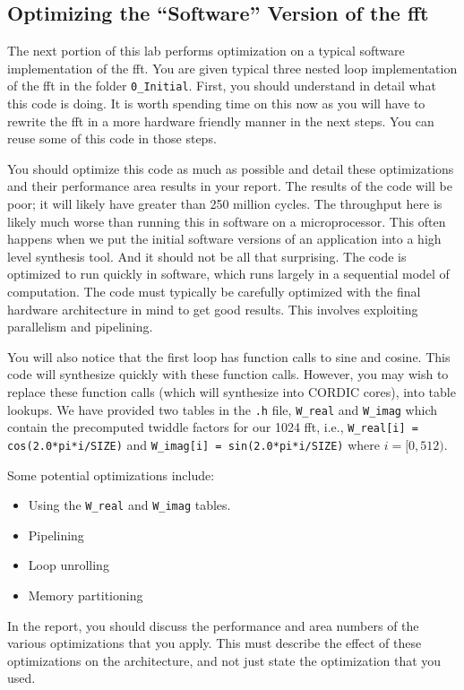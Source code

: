 \subsection{Optimizing the ``Software'' Version of the \gls{fft}}
The next portion of this lab performs optimization on a typical software implementation of the \gls{fft}. You are given typical three nested loop implementation of the \gls{fft} in the folder \texttt{0\_Initial}. First, you should understand in detail what this code is doing. It is worth spending time on this now as you will have to rewrite the \gls{fft} in a more hardware friendly manner in the next steps. You can reuse some of this code in those steps.

You should optimize this code as much as possible and detail these optimizations and their performance area results in your report. The results of the code will be poor; it will likely have greater than 250 million cycles. The throughput here is likely much worse than running this in software on a microprocessor. This often happens when we put the initial software versions of an application into a high level synthesis tool. And it should not be all that surprising. The code is optimized to run quickly in software, which runs largely in a sequential model of computation. The code must typically be carefully optimized with the final hardware architecture in mind to get good results. This involves exploiting parallelism and pipelining.

You will also notice that the first loop has function calls to sine and cosine. This code will synthesize quickly with these function calls. However, you may wish to replace these function calls (which will synthesize into CORDIC cores), into table lookups. We have provided two tables in the \texttt{.h} file, \texttt{W\_real} and \texttt{W\_imag} which contain the precomputed twiddle factors for our 1024 \gls{fft}, i.e., \texttt{W\_real[i] = cos(2.0*pi*i/SIZE)} and \texttt{W\_imag[i] = sin(2.0*pi*i/SIZE)} where $i = [0,512)$.

Some potential optimizations include:
\begin{itemize}
\item Using the \texttt{W\_real} and \texttt{W\_imag} tables.
\item Pipelining
\item Loop unrolling
\item Memory partitioning
\end{itemize}

In the report, you should discuss the performance and area numbers of the various optimizations that you apply. This must describe the effect of these optimizations on the architecture, and not just state the optimization that you used.

